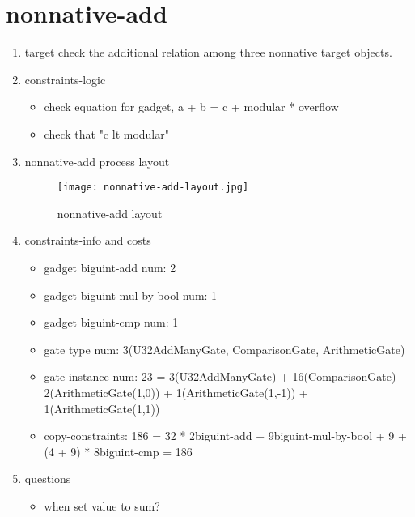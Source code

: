 \section{nonnative-add}
\label{nonnative-add}

\begin{enumerate}
    \item target
        check the additional relation among three nonnative target objects.
    \item constraints-logic
        \begin{itemize}
            \item check equation for gadget,  a + b = c + modular * overflow
            \item check that "c lt modular"
        \end{itemize}
    \item nonnative-add process layout
        \begin{figure}[!ht]
            \centering
            \texttt{[image: nonnative-add-layout.jpg]}
            \caption{nonnative-add layout}
            \label{fig:nonnative-add-layout}
        \end{figure}
    
    \item constraints-info and costs
        \begin{itemize}
            \item gadget biguint-add num: 2
            \item gadget biguint-mul-by-bool num: 1
            \item gadget biguint-cmp num: 1
            \item gate type num: 3(U32AddManyGate, ComparisonGate, ArithmeticGate)
            \item gate instance num: 23 = 3(U32AddManyGate) + 16(ComparisonGate) + 2(ArithmeticGate(1,0)) + 1(ArithmeticGate(1,-1)) + 1(ArithmeticGate(1,1))
            \item copy-constraints: 186 = 32 * 2{biguint-add} + 9{biguint-mul-by-bool} + 9 + (4 + 9) * 8{biguint-cmp} = 186
        \end{itemize}

    \item questions
        \begin{itemize}
            \item when set value to sum?
        \end{itemize}

\end{enumerate}